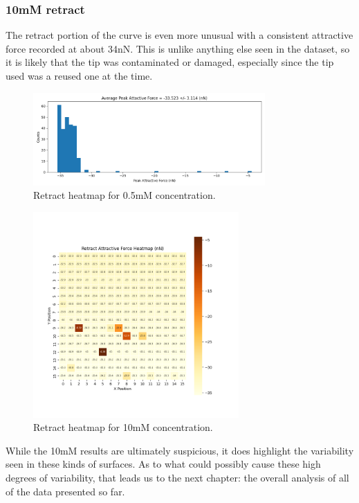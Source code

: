\newpage
\subsubsection{10mM retract}

The retract portion of the curve is even more unusual with a consistent attractive force recorded at about 34nN. This is unlike anything else seen in the dataset, so it is likely that the tip was contaminated or damaged, especially since the tip used was a reused one at the time.

\begin{figure}[h!!!]
    \centering
    \includegraphics[width=0.79\textwidth]{chapter7/ForceMaps/10mM/contact_force_histogram.png}
    \caption{Retract heatmap for 0.5mM concentration.}
    \label{fig:contfhist}
\end{figure}

\begin{figure}[h!]
\centering
\includegraphics[width=0.7\textwidth]{chapter7/ForceMaps/10mM/Retract_heatmap.png}
\caption{Retract heatmap for 10mM concentration.}
\label{fig:pHOverall}
\end{figure}

While the 10mM results are ultimately suspicious, it does highlight the variability seen in these kinds of surfaces. As to what could possibly cause these high degrees of variability, that leads us to the next chapter: the overall analysis of all of the data presented so far.
